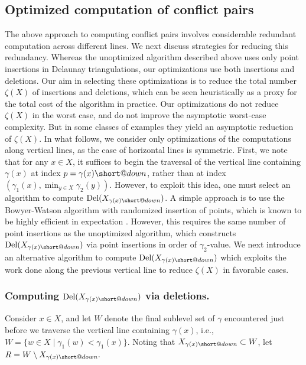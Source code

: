 \documentclass[11pt]{amsart}
\makeatletter
\DeclareMathOperator{\DelT}{Del}
\DeclareRobustCommand{\subdown}{%
  \mathrel{\mathpalette\short@down\relax}%
}
\newcommand{\short@down}[2]{%
  \mkern2mu
  \clipbox{0 0 0 {.45\height}}{$\m@th#1\vphantom{+}{\downarrow}$}%
}
\renewcommand{\subparagraph}[1]{\subsubsection*{\textbf{\textup{#1}}}}
\theoremstyle{plain}
\theoremstyle{definition}
\theoremstyle{remark}
\makeatother
\begin{document}
\subsection{Optimized computation of conflict pairs}
\label{Sec:Optimizations}
The above approach to computing conflict pairs involves considerable redundant computation across different lines.  We next discuss strategies for reducing this redundancy.    Whereas the unoptimized algorithm described above uses only point insertions in Delaunay triangulations, our optimizations use both insertions and deletions.  Our aim in selecting these optimizations is to reduce  the total number $\zeta(X)$ of insertions and deletions, which can be seen heuristically as a proxy for the total cost of the algorithm in practice.  Our optimizations do not reduce $\zeta(X)$ in the worst case, and do not improve the asymptotic worst-case complexity.
But in some classes of examples they yield an asymptotic reduction of $\zeta(X)$.%
%
In what follows, we consider only optimizations of the computations along vertical lines, as the case of horizontal lines is symmetric.  First, we note that for any $x\in X$, it suffices to begin the traversal of the vertical line containing $\gamma(x)$ at index $p=\gamma(x){\subdown}$, rather than at index $(\gamma_1(x),\min_{y\in X}\gamma_2(y))$.  However, to exploit this idea, one must select an algorithm to compute $\DelT(X_{\gamma(x){\subdown}})$.  A simple approach is to use the Bowyer-Watson algorithm with randomized insertion of points, which is known to be highly efficient in expectation \cite{Clarkson1989}.  However, this requires the same number of point insertions as the unoptimized algorithm, which constructs $\DelT(X_{\gamma(x){\subdown}})$ via point insertions in order of $\gamma_2$-value.  
We next introduce an alternative algorithm to compute $\DelT(X_{\gamma(x){\subdown}})$ which exploits the work done along the previous vertical line to reduce $\zeta(X)$ in favorable cases.
%
%
\subparagraph{Computing $\DelT(X_{\gamma(x){\subdown}})$ via deletions.}
Consider $x\in X$, and let $W$ denote the final sublevel set of $\gamma$ encountered just before we traverse the vertical line containing $\gamma(x)$, i.e., $W=\{w\in X\mid \gamma_1(w)<\gamma_1(x)\}$.  Noting that $X_{\gamma(x){\subdown}}\subset W$, let $R= W \setminus X_{\gamma(x){\subdown}}.$
\end{document}
